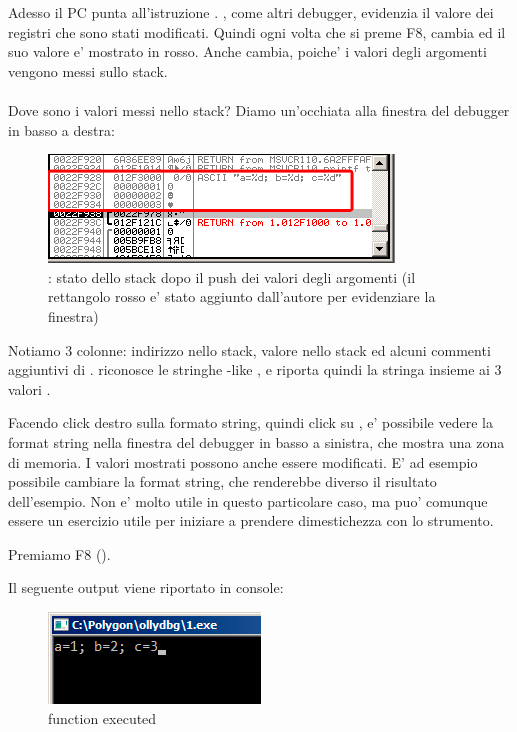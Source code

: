 Adesso il \ac{PC} punta all'istruzione .
\olly, come altri debugger, evidenzia il valore dei registri che sono stati modificati.
Quindi ogni volta che si preme F8, \EIP cambia ed il suo valore e' mostrato in rosso.
Anche \ESP cambia, poiche' i valori degli argomenti vengono messi sullo stack.
\\
\\

Dove sono i valori messi nello stack?
Diamo un'occhiata alla finestra del debugger in basso a destra:

\begin{figure}[H]
\centering
\includegraphics[scale=\NormalScale]{patterns/03_printf/x86/olly3_stack.png}
\caption{\olly: stato dello stack dopo il push dei valori degli argomenti (il rettangolo rosso e' stato aggiunto dall'autore per evidenziare la finestra)}
\end{figure}

Notiamo 3 colonne: indirizzo nello stack, valore nello stack ed alcuni commenti aggiuntivi di \olly. 
\olly riconosce le stringhe \printf{}-like , e riporta quindi la stringa insieme ai 3 valori .

Facendo click destro sulla formato string, quindi click su ,
e' possibile vedere la format string nella finestra del debugger in basso a sinistra, che mostra una zona di memoria.
I valori mostrati possono anche essere modificati.
E' ad esempio possibile cambiare la format string, che renderebbe diverso il risultato dell'esempio.
Non e' molto utile in questo particolare caso, ma puo' comunque essere un esercizio utile per iniziare a prendere dimestichezza con lo strumento.

\clearpage
Premiamo F8 (\stepover).

Il seguente output viene riportato in console:

\begin{figure}[H]
\centering
\includegraphics[scale=\NormalScale]{patterns/03_printf/x86/olly3_console.png}
\caption{\printf function executed}
\end{figure}

